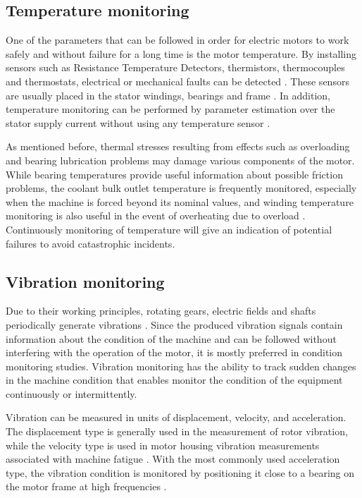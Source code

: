 \subsection{Temperature monitoring}

One of the parameters that can be followed in order for electric motors to work safely and without failure for a long time is the motor temperature. By installing sensors such as Resistance Temperature Detectors, thermistors, thermocouples and thermostats, electrical or mechanical faults can be detected \cite{mistry2016rotating}. These sensors are usually placed in the stator windings, bearings and frame \cite{ieee2017}. In addition, temperature monitoring can be performed by parameter estimation over the stator supply current without using any temperature sensor \cite{kumar2019comprehensive}.

As mentioned before, thermal stresses resulting from effects such as overloading and bearing lubrication problems may damage various components of the motor. While bearing temperatures provide useful information about possible friction problems, the coolant bulk outlet temperature is frequently monitored, especially when the machine is forced beyond its nominal values, and winding temperature monitoring is also useful in the event of overheating due to overload \cite{thorsen1998methods}. Continuously monitoring of temperature will give an indication of potential failures to avoid catastrophic incidents.

\subsection{Vibration monitoring}

Due to their working principles, rotating gears, electric fields and shafts periodically generate vibrations \cite{randall2021vibration}. Since the produced vibration signals contain information about the condition of the machine and can be followed without interfering with the operation of the motor, it is mostly preferred in condition monitoring studies. Vibration monitoring has the ability to track sudden changes in the machine condition that enables monitor the condition of the equipment continuously or intermittently.

Vibration can be measured in units of displacement, velocity, and acceleration. The displacement type is generally used in the measurement of rotor vibration, while the velocity type is used in motor housing vibration measurements associated with machine fatigue \cite{mistry2016rotating}. With the most commonly used acceleration type, the vibration condition is monitored by positioning it close to a bearing on the motor frame at high frequencies \cite{mistry2016rotating,iso}.

